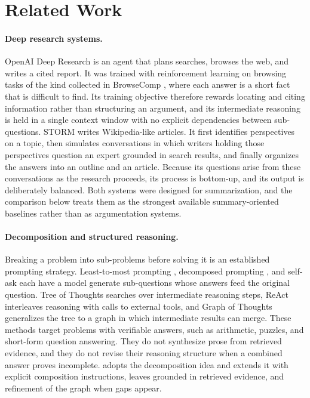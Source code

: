 \section{Related Work}
\label{sec:related}

\paragraph{Deep research systems.}
OpenAI Deep Research \citep{openai2025deepresearch} is an agent that plans searches, browses the web, and writes a cited report. It was trained with reinforcement learning on browsing tasks of the kind collected in BrowseComp \citep{wei2025browsecomp}, where each answer is a short fact that is difficult to find. Its training objective therefore rewards locating and citing information rather than structuring an argument, and its intermediate reasoning is held in a single context window with no explicit dependencies between sub-questions. STORM \citep{shao2024storm} writes Wikipedia-like articles. It first identifies perspectives on a topic, then simulates conversations in which writers holding those perspectives question an expert grounded in search results, and finally organizes the answers into an outline and an article. Because its questions arise from these conversations as the research proceeds, its process is bottom-up, and its output is deliberately balanced. Both systems were designed for summarization, and the comparison below treats them as the strongest available summary-oriented baselines rather than as argumentation systems.

\paragraph{Decomposition and structured reasoning.}
Breaking a problem into sub-problems before solving it is an established prompting strategy. Least-to-most prompting \citep{zhou2023leasttomost}, decomposed prompting \citep{khot2023decomposed}, and self-ask \citep{press2023selfask} each have a model generate sub-questions whose answers feed the original question. Tree of Thoughts \citep{yao2023tot} searches over intermediate reasoning steps, ReAct \citep{yao2023react} interleaves reasoning with calls to external tools, and Graph of Thoughts \citep{besta2024got} generalizes the tree to a graph in which intermediate results can merge. These methods target problems with verifiable answers, such as arithmetic, puzzles, and short-form question answering. They do not synthesize prose from retrieved evidence, and they do not revise their reasoning structure when a combined answer proves incomplete. \sys{} adopts the decomposition idea and extends it with explicit composition instructions, leaves grounded in retrieved evidence, and refinement of the graph when gaps appear.

